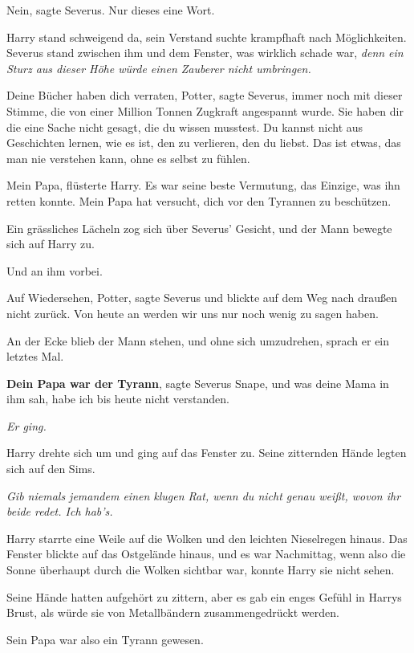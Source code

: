 \glqq{}Nein\grqq{}, sagte Severus. Nur dieses eine Wort.

Harry stand schweigend da, sein Verstand suchte krampfhaft nach Möglichkeiten.
Severus stand zwischen ihm und dem Fenster, was wirklich schade war, \emph{denn
ein Sturz aus dieser Höhe würde einen Zauberer nicht umbringen.}

\glqq{}Deine Bücher haben dich verraten, Potter\grqq{}, sagte Severus, immer
noch mit dieser Stimme, die von einer Million Tonnen Zugkraft angespannt wurde.
\glqq{}Sie haben dir die eine Sache nicht gesagt, die du wissen musstest. Du
kannst nicht aus Geschichten lernen, wie es ist, den zu verlieren, den du
liebst. Das ist etwas, das man nie verstehen kann, ohne es selbst zu
fühlen.\grqq{}

\glqq{}Mein Papa\grqq{}, flüsterte Harry. Es war seine beste Vermutung, das
Einzige, was ihn retten konnte. \glqq{}Mein Papa hat versucht, dich vor den
Tyrannen zu beschützen.\grqq{}

Ein grässliches Lächeln zog sich über Severus' Gesicht, und der Mann bewegte
sich auf Harry zu.

Und an ihm vorbei.

\glqq{}Auf Wiedersehen, Potter\grqq{}, sagte Severus und blickte auf dem Weg
nach draußen nicht zurück. \glqq{}Von heute an werden wir uns nur noch wenig zu
sagen haben.\grqq{}

An der Ecke blieb der Mann stehen, und ohne sich umzudrehen, sprach er ein
letztes Mal.

\glqq{}
\textbf{Dein Papa war der Tyrann}\grqq{}, sagte Severus Snape, \glqq{}und was
deine Mama in ihm sah, habe ich bis heute nicht verstanden.\grqq{}

\emph{Er ging.}

Harry drehte sich um und ging auf das Fenster zu. Seine zitternden Hände legten
sich auf den Sims.

\emph{Gib niemals jemandem einen klugen Rat, wenn du nicht genau weißt, wovon
ihr beide redet. Ich hab's.}

Harry starrte eine Weile auf die Wolken und den leichten Nieselregen hinaus. Das
Fenster blickte auf das Ostgelände hinaus, und es war Nachmittag, wenn also die
Sonne überhaupt durch die Wolken sichtbar war, konnte Harry sie nicht sehen.

Seine Hände hatten aufgehört zu zittern, aber es gab ein enges Gefühl in Harrys
Brust, als würde sie von Metallbändern zusammengedrückt werden.

Sein Papa war also ein Tyrann gewesen.

